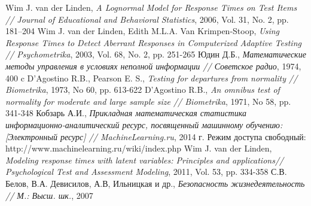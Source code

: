 \begin{thebibliography}{2}
 Wim J. van der Linden, {\itshape   A Lognormal Model for Response Times on Test Items // Journal of Educational and Behavioral Statistics}, 2006, Vol. 31, No. 2, pp. 181–204
 Wim J. van der Linden, Edith M.L.A. Van Krimpen-Stoop, {\itshape  Using Response Times to Detect Aberrant Responses in Computerized Adaptive Testing // Psychometrika}, 2003, Vol. 68, No. 2, pp. 251-265
 Юдин Д.Б., {\itshape Математические методы управления в условиях неполной информации // Советское радио}, 1974, 400 c
 D'Agostino R.B., Pearson E. S., {\itshape Testing for departures from normality // Biometrika}, 1973, No 60, pp. 613-622
 D'Agostino R.B., {\itshape An omnibus test of normality for moderate and large sample size // Biometrika}, 1971, No 58, pp. 341-348
 Кобзарь А.И., {\itshape Прикладная математическая статистика}
 {\itshape информационно-аналитический ресурс, посвященный машинному обучению: [Электронный ресурс] // MachineLearning.ru}, 2014 г. Режим доступа свободный: http://www.machinelearning.ru/wiki/index.php
 Wim J. van der Linden, {\itshape  Modeling response times with latent variables: Principles and applications// Psychological Test and Assessment Modeling}, 2011, Vol. 53, pp. 334-358
 С.В. Белов, В.А. Девисилов, А.В, Ильницкая и др., {\itshape   Безопасность жизнедеятельность // М.: Высш. шк.}, 2007

\end{thebibliography}